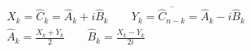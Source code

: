 \scriptsize
\begin{gather}
X_k = \hat{C}_k = \hat{A}_k + i \hat{B}_k \qquad Y_k = \overline{\hat{C}_{n - k}} = \hat{A}_k -i \hat{B}_k \\
\hat{A}_k = \frac{X_k + Y_k}{2} \qquad \hat{B}_k = \frac{X_k - Y_k}{2 i}
\end{gather} 
